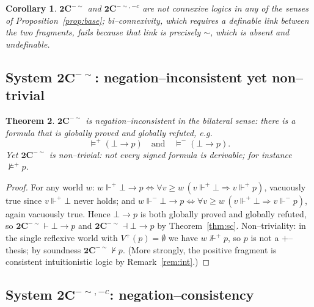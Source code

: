 \documentclass{amsart}
\theoremstyle{plain}
\newtheorem{theorem}{Theorem}
\newtheorem{corollary}[theorem]{Corollary}
\theoremstyle{definition}
\newcommand{\To}{\rightarrow}
\newcommand{\Ci}{\mathbf{2C}^{-{\sim}}}        %
\newcommand{\Cii}{\mathbf{2C}^{-{\sim},-c}}    %
\newcommand{\fp}{\Vdash^{+}}
\newcommand{\fm}{\Vdash^{-}}
\newcommand{\proves}{\vdash}
\newcommand{\refutes}{\dashv}
\begin{document}
\begin{corollary}
$\Ci$ and $\Cii$ are not connexive logics in any of the senses of
Proposition~\ref{prop:base}; bi--connexivity, which requires a definable link
between the two fragments, fails because that link is precisely ${\sim}$, which
is absent and undefinable.
\end{corollary}

\subsection{System $\Ci$: negation--inconsistent yet non--trivial}

\begin{theorem}\label{thm:Ci-incon}
$\Ci$ is \emph{negation--inconsistent} in the bilateral sense: there is a formula
that is globally proved and globally refuted, e.g.
\[
\models^{+}(\bot\To p)\quad\text{and}\quad\models^{-}(\bot\To p).
\]
Yet $\Ci$ is \emph{non--trivial}: not every signed formula is derivable; for
instance $\not\models^{+}p$.
\end{theorem}
\begin{proof}
For any world $w$: $w\fp\bot\To p\iff\forall v\ge w\,(v\fp\bot\Rightarrow v\fp
p)$, vacuously true since $v\fp\bot$ never holds; and $w\fm\bot\To p\iff\forall
v\ge w\,(v\fp\bot\Rightarrow v\fm p)$, again vacuously true. Hence $\bot\To p$ is
both globally proved and globally refuted, so $\Ci\proves\bot\To p$ and
$\Ci\refutes\bot\To p$ by Theorem~\ref{thm:sc}. Non--triviality: in the single
reflexive world with $V^{+}(p)=\emptyset$ we have $w\not\fp p$, so $p$ is not a
$+$--thesis; by soundness $\Ci\not\proves p$. (More strongly, the positive
fragment is consistent intuitionistic logic by Remark~\ref{rem:int}.)
\end{proof}

\subsection{System $\Cii$: negation--consistency}
\end{document}
